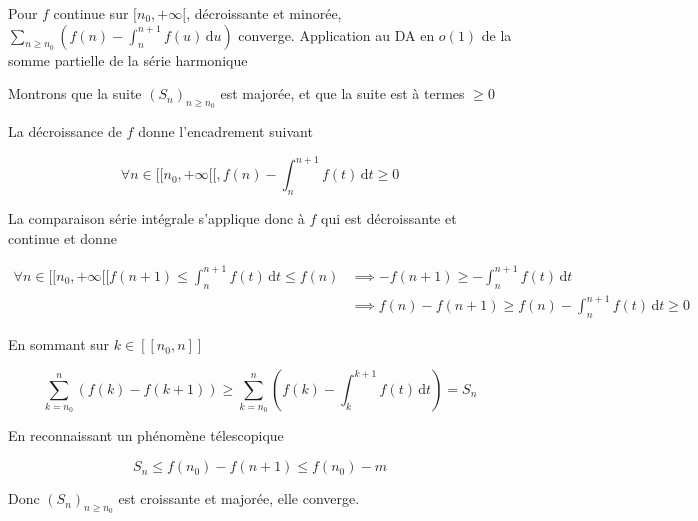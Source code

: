 \documentclass{article}
\renewenvironment{question_kholle}[2][ ]
{
	\subsection{\texorpdfstring{#2}{}}
	\notblank{#1}
	{
		\noindent #1
		\bigbreak
	}
	{}
	\begin{proof}
}
{
	\end{proof}
}
\begin{document}
\begin{question_kholle}[{Soit $n_{0} \in \N$ et $f:[n_{0}, +\infty[ \to \R$ une fonction continue, décroissante et minorée par $m \in \R$.
  Alors la série de terme général
  $$\left( f(n)- \int_{n}^{n+1} f(u) \, \mathrm du  \right)_{n\geqslant n_{0}}$$
  est à termes positifs ou nuls et converge.
  }]{Pour $f$ continue sur $[n_0, +\infty[$, décroissante et minorée, $\displaystyle\sum_{n\geqslant n_{0}}\left( f(n)- \int_{n}^{n+1} f(u) \, \mathrm du  \right)$ converge. Application au DA en $o(1)$ de la somme partielle de la série harmonique}

  Montrons que la suite $(S_{n})_{n\geqslant n_{0}}$ est majorée, et que la suite est à termes $\geqslant 0$
  
  La décroissance de $f$ donne l'encadrement suivant

  $$\forall n \in [ \! [ n_{0} , +\infty[\![,  f(n) - \int_{n}^{n+1} f(t) \, \mathrm dt \geqslant 0$$

  La comparaison série intégrale s'applique donc à $f$ qui est décroissante et continue et donne

  \begin{align*}
    \forall n \in [ \! [ n_{0}, +\infty [ \![ f(n+1)\leqslant \int_{n}^{n+1} f(t) \, \mathrm dt \leqslant f(n) & \implies -f(n+1) \geqslant -\int_{n}^{n+1} f(t) \, \mathrm dt                          \\
                                                                                                               & \implies f(n) - f(n+1) \geqslant f(n) - \int_{ n}^{n+1} f(t) \, \mathrm dt \geqslant 0
  \end{align*}

  En sommant sur $k \in [ \! [ n_{0}, n ] \!]$

  $$\sum_{k=n_{0}}^{n} (f(k) - f(k+1)) \geqslant  \sum_{k=n_{0}}^{n}\left( f(k) - \int_{k}^{k+1} f(t) \, \mathrm dt  \right) = S_{n}$$

  En reconnaissant un phénomène télescopique

  $$S_{n} \leqslant f(n_{0})-f(n+1)\leqslant f(n_{0})- m $$

  Donc $(S_{n})_{n\geqslant n_{0}}$ est croissante et majorée, elle converge.
  \\

  \begin{figure}[H]
    \centering
\end{figure}
\end{question_kholle}
\end{document}
